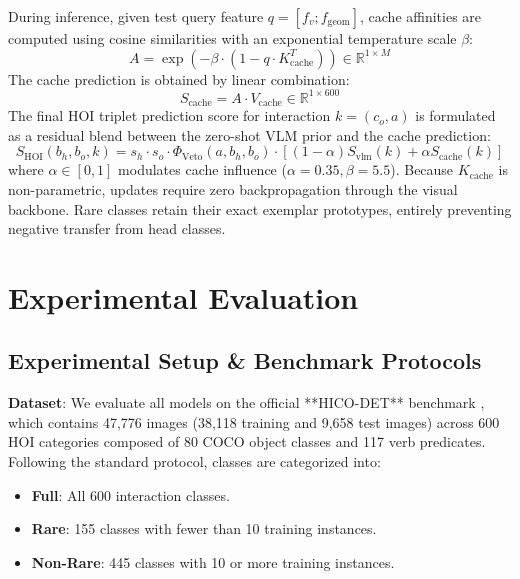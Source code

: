 \documentclass[conference]{IEEEtran}
\begin{document}
During inference, given test query feature $q = [f_v; f_{\text{geom}}]$, cache affinities are computed using cosine similarities with an exponential temperature scale $\beta$:
\begin{equation}
    A = \exp\left( -\beta \cdot (1 - q \cdot K_{\text{cache}}^T) \right) \in \mathbb{R}^{1 \times M}
\end{equation}
The cache prediction is obtained by linear combination:
\begin{equation}
    S_{\text{cache}} = A \cdot V_{\text{cache}} \in \mathbb{R}^{1 \times 600}
\end{equation}
The final HOI triplet prediction score for interaction $k = (c_o, a)$ is formulated as a residual blend between the zero-shot VLM prior and the cache prediction:
\begin{equation}
    S_{\text{HOI}}(b_h, b_o, k) = s_h \cdot s_o \cdot \Phi_{\text{Veto}}(a, b_h, b_o) \cdot \left[ (1 - \alpha) S_{\text{vlm}}(k) + \alpha S_{\text{cache}}(k) \right]
\end{equation}
where $\alpha \in [0, 1]$ modulates cache influence ($\alpha = 0.35, \beta = 5.5$). Because $K_{\text{cache}}$ is non-parametric, updates require zero backpropagation through the visual backbone. Rare classes retain their exact exemplar prototypes, entirely preventing negative transfer from head classes.

\section{Experimental Evaluation}

\subsection{Experimental Setup & Benchmark Protocols}
\textbf{Dataset}: We evaluate all models on the official **HICO-DET** benchmark \cite{chao2018hicodet}, which contains 47,776 images (38,118 training and 9,658 test images) across 600 HOI categories composed of 80 COCO object classes and 117 verb predicates. Following the standard protocol, classes are categorized into:
\begin{itemize}
    \item \textbf{Full}: All 600 interaction classes.
    \item \textbf{Rare}: 155 classes with fewer than 10 training instances.
    \item \textbf{Non-Rare}: 445 classes with 10 or more training instances.
\end{itemize}
\end{document}
